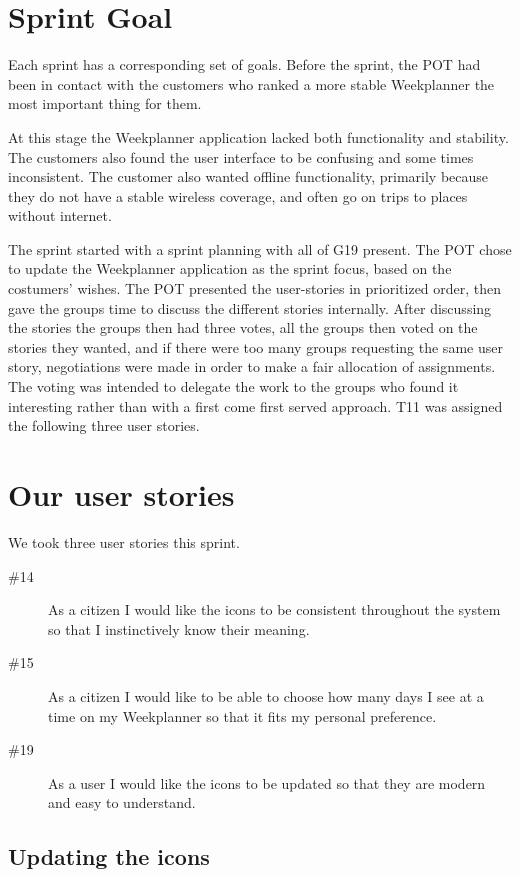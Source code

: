 \section{Sprint Goal}

Each sprint has a corresponding set of goals. Before the sprint, the \gls{POT} had been in contact with the customers who ranked a more stable Weekplanner the most important thing for them.

At this stage the Weekplanner application lacked both functionality and stability. The customers also found the user interface to be confusing and some times inconsistent. The customer also wanted offline functionality, primarily because they do not have a stable wireless coverage, and often go on trips to places without internet.

The sprint started with a sprint planning with all of \gls{G19} present. The \gls{POT} chose to update the Weekplanner application as the sprint focus, based on the costumers' wishes. The \gls{POT} presented the user-stories in prioritized order, then gave the groups time to discuss the different stories internally. After discussing the stories the groups then had three votes, all the groups then voted on the stories they wanted, and if there were too many groups requesting the same user story, negotiations were made in order to make a fair allocation of assignments. The voting was intended to delegate the work to the groups who found it interesting rather than with a first come first served approach. \gls{T11} was assigned the following three user stories.

\section{Our user stories}
We took three user stories this sprint.
\begin{description}
    \item [\#14] As a citizen I would like the icons to be consistent throughout the system so that I instinctively know their meaning.
    \item [\#15] As a citizen I would like to be able to choose how many days I see at a time on my Weekplanner so that it fits my personal preference.
    \item [\#19] As a user I would like the icons to be updated so that they are modern and easy to understand.
\end{description}

\subsection{Updating the icons}

